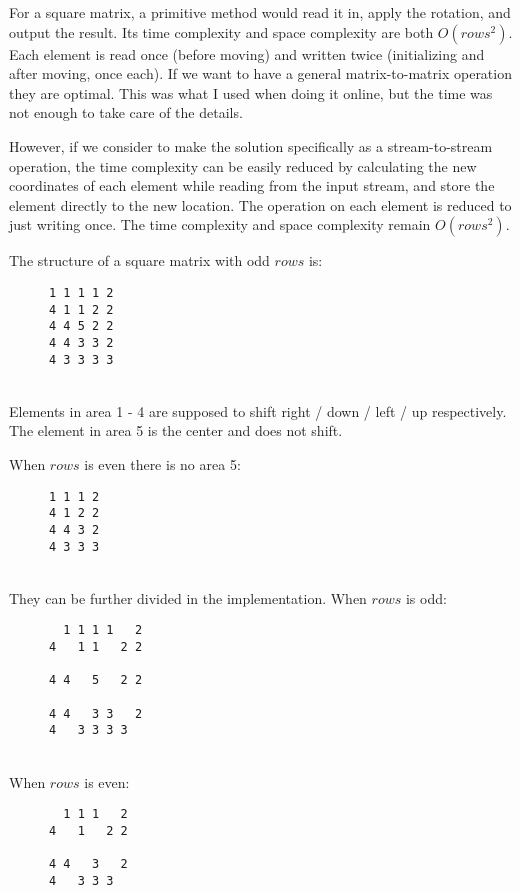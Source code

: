 For a square matrix, a primitive method would read it in, apply the rotation,
and output the result. Its time complexity and space complexity are both
$O(rows^2)$. Each element is read once (before moving) and written twice
(initializing and after moving, once each). If we want to have a general
matrix-to-matrix operation they are optimal. This was what I used when doing it
online, but the time was not enough to take care of the details.

However, if we consider to make the solution specifically as a stream-to-stream
operation, the time complexity can be easily reduced by calculating the new
coordinates of each element while reading from the input stream, and store the
element directly to the new location. The operation on each element is reduced
to just writing once. The time complexity and space complexity remain
$O(rows^2)$.

The structure of a square matrix with odd $rows$ is:\\
\begin{figure}[hbtp]
\begin{verbatim}
1 1 1 1 2
4 1 1 2 2
4 4 5 2 2
4 4 3 3 2
4 3 3 3 3
\end{verbatim}
\end{figure}\\
Elements in area 1 - 4 are supposed to shift right / down / left / up
respectively. The element in area 5 is the center and does not shift.

When $rows$ is even there is no area 5:\\
\begin{figure}[hbtp]
\begin{verbatim}
1 1 1 2
4 1 2 2
4 4 3 2
4 3 3 3
\end{verbatim}
\end{figure}\\
They can be further divided in the implementation. When $rows$ is odd:\\
\begin{figure}[hbtp]
\begin{verbatim}
  1 1 1 1   2
4   1 1   2 2

4 4   5   2 2

4 4   3 3   2
4   3 3 3 3
\end{verbatim}
\end{figure}\\
When $rows$ is even:\\
\begin{figure}[hbtp]
\begin{verbatim}
  1 1 1   2
4   1   2 2

4 4   3   2
4   3 3 3
\end{verbatim}
\end{figure}\\

